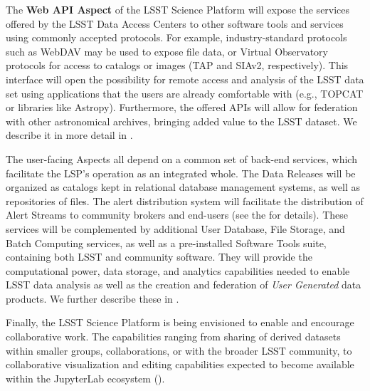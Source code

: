 The \textbf{Web API Aspect} of the LSST Science Platform will expose the
services offered by the LSST Data Access Centers to other software tools and
services using commonly accepted protocols. For example, industry-standard
protocols such as WebDAV may be used to expose file data, or Virtual Observatory
protocols for access to catalogs or images (TAP and SIAv2, respectively).
This interface will open the
possibility for remote access and analysis of the LSST data set using
applications that the users are already comfortable with (e.g., TOPCAT or libraries like Astropy).
Furthermore, the offered APIs will allow for federation
with other astronomical archives, bringing added value to the LSST dataset.
We describe it in more detail in .

The user-facing Aspects all depend on a common set of back-end services, which facilitate the LSP's operation as an integrated whole.
The Data Releases will be organized as catalogs kept in relational database management systems, as well as repositories of files.
The alert distribution system will facilitate the distribution of Alert Streams to community brokers and end-users (see the \DPDD for details).
These services will be complemented by additional User Database, File Storage, and Batch Computing services, as well as a pre-installed Software Tools suite, containing both LSST and community software.
They will provide the computational power, data storage, and analytics capabilities needed to enable LSST data analysis as well as the creation and federation of \emph{User Generated} data products.
We further describe these in .

Finally, the LSST Science Platform is being envisioned to enable and encourage
collaborative work.  The capabilities ranging from sharing of derived
datasets within smaller groups, collaborations, or with the broader LSST
community, to collaborative visualization and editing capabilities expected
to become available within the JupyterLab ecosystem ().
